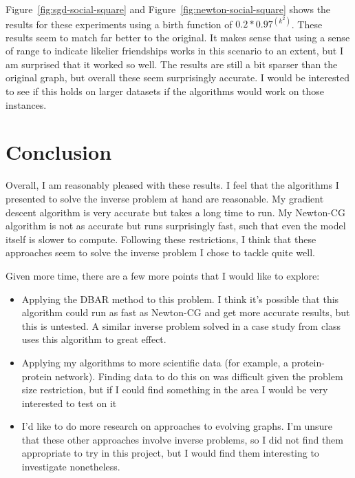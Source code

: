 Figure~\ref{fig:sgd-social-square} and Figure~\ref{fig:newton-social-square} shows the results for these experiments using a birth function of $0.2 * 0.97^(k^2)$.
These results seem to match far better to the original.
It makes sense that using a sense of range to indicate likelier friendships works in this scenario to an extent,
but I am surprised that it worked so well.
The results are still a bit sparser than the original graph, but overall these seem surprisingly accurate.
I would be interested to see if this holds on larger datasets if the algorithms would work on those instances.

\section{Conclusion}

Overall, I am reasonably pleased with these results.
I feel that the algorithms I presented to solve the inverse problem at hand are reasonable.
My gradient descent algorithm is very accurate but takes a long time to run.
My Newton-CG algorithm is not as accurate but runs surprisingly fast, such that even the model itself is slower to compute.
Following these restrictions, I think that these approaches seem to solve the inverse problem I chose to tackle quite well.

Given more time, there are a few more points that I would like to explore:
\begin{itemize}
    \item Applying the DBAR method to this problem. I think it's possible that this algorithm could run as fast as Newton-CG
          and get more accurate results, but this is untested. A similar inverse problem solved in a case study from class
          uses this algorithm to great effect.
    \item Applying my algorithms to more scientific data (for example, a protein-protein network). Finding data to do this
          on was difficult given the problem size restriction, but if I could find something in the area I would be very interested
          to test on it
    \item I'd like to do more research on approaches to evolving graphs. I'm unsure that these other approaches involve inverse problems,
          so I did not find them appropriate to try in this project, but I would find them interesting to investigate nonetheless.
\end{itemize}